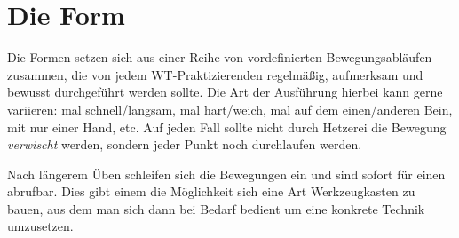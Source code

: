 


\newenvironment{WTSatz}[1]
	{\WTGaleryResetSlideshowCounter \subsection{#1}}
	{}

\newenvironment{WTSatzTeil}[2]
	{\paragraph{#1} (\textit{#2})}
	{}

\def\WTXFormen_EingangsGraphics#1{\texttt{[image: resources/images/eingangsform/\#1]}}


\def\WTSatzTechniken#1{\textbf{Ge\"ubte Techniken}: #1}

\def\WTKurzSatz#1#2#3{\paragraph{#1. #2} #3 (BILD!!! /resources/images/form/siunimtao/kurzsatz/#1.jpg)}




\renewcommand\chapterillustration{pushing_minimalistisch}
\chapter{Die Form}

Die Formen setzen sich aus einer Reihe von vordefinierten Bewegungsabl\"aufen zusammen, die von jedem WT-Praktizierenden regelm\"a{\ss}ig, aufmerksam und bewusst durchgef\"uhrt werden sollte. Die Art der Ausf\"uhrung hierbei kann gerne variieren: mal schnell/langsam, mal hart/weich, mal auf dem einen/anderen Bein, mit nur einer Hand, etc. Auf jeden Fall sollte nicht durch Hetzerei die Bewegung \textit{verwischt} werden, sondern jeder Punkt noch durchlaufen werden.

Nach l\"angerem \"Uben schleifen sich die Bewegungen ein und sind sofort f\"ur einen abrufbar. Dies gibt einem die M\"oglichkeit sich eine Art Werkzeugkasten zu bauen, aus dem man sich dann bei Bedarf bedient um eine konkrete Technik umzusetzen.


\newpage


